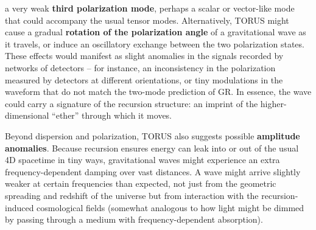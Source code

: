 \documentclass[
]{article}
\begin{document}
{\begin{itemize}
  a very weak \textbf{third polarization mode}, perhaps a scalar or
  vector-like mode that could accompany the usual tensor
  modes\hspace{0pt}. Alternatively, TORUS might cause a gradual
  \textbf{rotation of the polarization angle} of a gravitational wave as
  it travels, or induce an oscillatory exchange between the two
  polarization states. These effects would manifest as slight anomalies
  in the signals recorded by networks of detectors -- for instance, an
  inconsistency in the polarization measured by detectors at different
  orientations, or tiny modulations in the waveform that do not match
  the two-mode prediction of GR. In essence, the wave could carry a
  signature of the recursion structure: an imprint of the
  higher-dimensional ``ether'' through which it moves.
\end{itemize}

Beyond dispersion and polarization, TORUS also suggests possible
\textbf{amplitude anomalies}. Because recursion ensures energy can leak
into or out of the usual 4D spacetime in tiny ways, gravitational waves
might experience an extra frequency-dependent damping over vast
distances\hspace{0pt}. A wave might arrive slightly weaker at certain
frequencies than expected, not just from the geometric spreading and
redshift of the universe but from interaction with the recursion-induced
cosmological fields (somewhat analogous to how light might be dimmed by
passing through a medium with frequency-dependent absorption).

}
\end{document}
